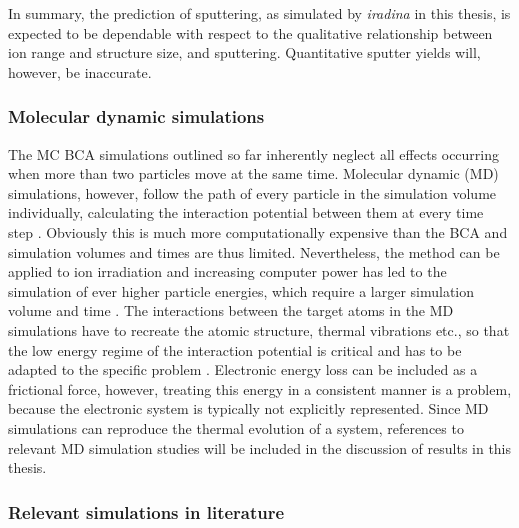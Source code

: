 In summary, the prediction of sputtering, as simulated by \emph{iradina} in this thesis, is expected to be dependable with respect to the qualitative relationship between ion range and structure size, and sputtering. Quantitative sputter yields will, however, be inaccurate.


\subsubsection{Molecular dynamic simulations}

The MC BCA simulations outlined so far inherently neglect all effects occurring when more than two particles move at the same time. Molecular dynamic (MD) simulations, however, follow the path of every particle in the simulation volume individually, calculating the interaction potential between them at every time step \cite{alder_studies_1959}. Obviously this is much more computationally expensive than the BCA and simulation volumes and times are thus limited. Nevertheless, the method can be applied to ion irradiation \cite{nordlund_molecular_1995} and increasing computer power has led to the simulation of ever higher particle energies, which require a larger simulation volume and time \cite{greaves_enhanced_2013,baumer_prediction_2014,anders_sputtering_2015}. The interactions between the target atoms in the MD simulations have to recreate the atomic structure, thermal vibrations etc., so that the low energy regime of the interaction potential is critical and has to be adapted to the specific problem \cite{dedkov_interatomic_1995,nordlund_repulsive_1997,albe_modeling_2002,nordlund_interatomic_2008,primetzhofer_inelastic_2012,primetzhofer_local_2013}. Electronic energy loss can be included as a frictional force, however, treating this energy in a consistent manner is a problem, because the electronic system is typically not explicitly represented. Since MD simulations can reproduce the thermal evolution of a system, references to relevant MD simulation studies will be included in the discussion of results in this thesis.


\subsubsection{Relevant simulations in literature}

